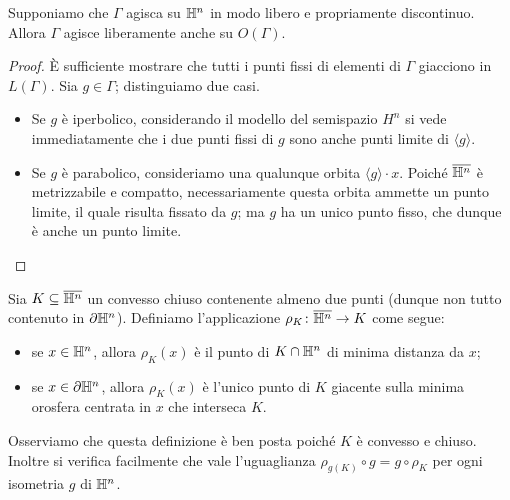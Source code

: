 \begin{proposition*}
Supponiamo che $\Gamma$ agisca su $\mathbb{H}^n$ in modo libero e propriamente discontinuo. Allora $\Gamma$ agisce liberamente anche su $O(\Gamma)$.
\end{proposition*}
\begin{proof}
È sufficiente mostrare che tutti i punti fissi di elementi di $\Gamma$ giacciono in $L(\Gamma)$. Sia $g\in\Gamma$; distinguiamo due casi.
\begin{itemize}
\item Se $g$ è iperbolico, considerando il modello del semispazio $H^n$ si vede immediatamente che i due punti fissi di $g$ sono anche punti limite di $\langle g\rangle$.
\item Se $g$ è parabolico, consideriamo una qualunque orbita $\langle g\rangle \cdot x$. Poiché $\overline{\mathbb{H}^n}$ è metrizzabile e compatto, necessariamente questa orbita ammette un punto limite, il quale risulta fissato da $g$; ma $g$ ha un unico punto fisso, che dunque è anche un punto limite.\qedhere
\end{itemize}
\end{proof}

\begin{definition*}
Sia $K\subseteq\overline{\mathbb{H}^n}$ un convesso chiuso contenente almeno due punti (dunque non tutto contenuto in $\partial\mathbb{H}^n$). Definiamo l'applicazione $\rho_K\colon\overline{\mathbb{H}^n}\to K$ come segue:
\begin{itemize}
\item se $x\in\mathbb{H}^n$, allora $\rho_K(x)$ è il punto di $K\cap\mathbb{H}^n$ di minima distanza da $x$;
\item se $x\in\partial\mathbb{H}^n$, allora $\rho_K(x)$ è l'unico punto di $K$ giacente sulla minima orosfera centrata in $x$ che interseca $K$.
\end{itemize}
\end{definition*}
Osserviamo che questa definizione è ben posta poiché $K$ è convesso e chiuso. Inoltre si verifica facilmente che vale l'uguaglianza $\rho_{g(K)}\circ g=g\circ\rho_K$ per ogni isometria $g$ di $\mathbb{H}^n$.

